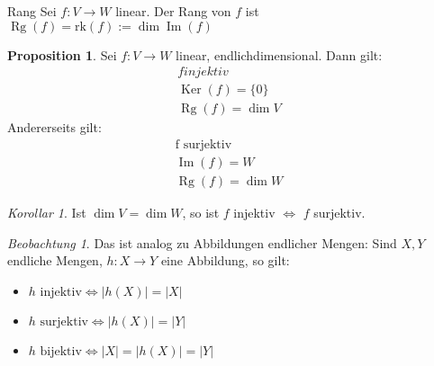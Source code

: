 \documentclass[11pt]{article}
\DeclareMathOperator{\mdim}{dim}
\DeclareMathOperator{\mKer}{Ker}
\DeclareMathOperator{\mIm}{Im}
\DeclareMathOperator{\mRg}{Rg}
\theoremstyle{remark}
\theoremstyle{definition}
\newtheorem*{proposition}{Proposition}
\theoremstyle{remark}
\newtheorem*{korollar}{Korollar}
\newtheorem*{beobachtung}{Beobachtung}
\begin{document}
\begin{definition}{Rang}{}
Sei $f:V\to W$ linear. Der Rang von \(f\) ist $\mRg(f) = \text{rk}(f) := \dim\mIm(f)$
\end{definition}

\begin{proposition} Sei \(f:V\to W\) linear, endlichdimensional.
Dann gilt:
\begin{align*}
	f injektiv &
	\\ \mKer(f) = \{0\}  &
	\\ \mRg(f) = \dim V &
\end{align*}
Andererseits gilt:
\begin{align*}
	\text{f surjektiv}
	\\ \mIm(f) = W  &
	\\ \mRg(f) = \dim W &
\end{align*}
\end{proposition}

\begin{korollar} Ist \(\mdim V = \mdim W \), so ist \(f\) injektiv $\iff $ \(f\) surjektiv.\end{korollar}
\begin{beobachtung}
	Das ist analog zu Abbildungen endlicher Mengen: Sind \(X,Y\) endliche Mengen, \(h: X\to Y\) eine Abbildung, so gilt:
	\begin{itemize}
		\item \(h\text{ injektiv} \iff |h(X)| = |X| \)
		\item \(h\text{ surjektiv} \iff |h(X)| = |Y| \)
		\item \(h\text{ bijektiv} \iff |X|=|h(X)|=|Y| \)
	\end{itemize}
\end{beobachtung}
\end{document}
